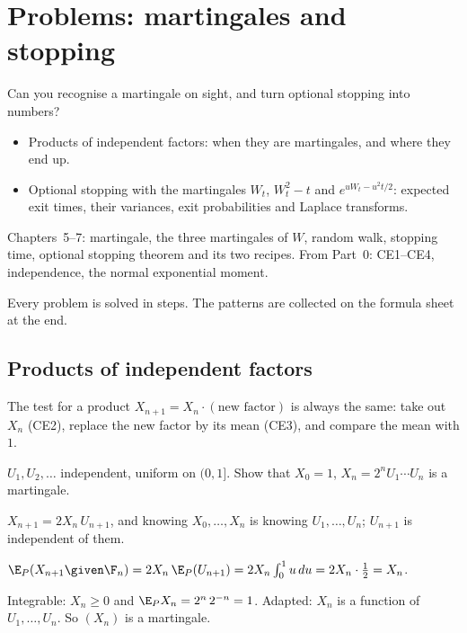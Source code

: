 \chapter{Problems: martingales and stopping}
\label{ch:prob-mg}

\begin{question}
Can you recognise a martingale on sight, and turn optional stopping into numbers?
\end{question}

\begin{whatfor}
\begin{itemize}
  \item Products of independent factors: when they are martingales, and where they end up.
  \item Optional stopping with the martingales $W_t$, $W_t^2-t$ and $e^{uW_t-u^2t/2}$: expected exit times, their variances, exit probabilities and Laplace transforms.
\end{itemize}
\end{whatfor}

\begin{prereq}
Chapters~5--7: martingale, the three martingales of $W$, random walk, stopping time, optional stopping theorem and its two recipes. From Part~0: CE1--CE4, independence, the normal exponential moment.
\end{prereq}

Every problem is solved in steps. The patterns are collected on the formula sheet at the end.

\section{Products of independent factors}

The test for a product $X_{n+1}=X_n\cdot(\text{new factor})$ is always the same: take out $X_n$ (CE2), replace the new factor by its mean (CE3), and compare the mean with $1$.

\begin{problem}
$U_1,U_2,\ldots$ independent, uniform on $(0,1]$. Show that $X_0=1$, $X_n=2^nU_1\cdots U_n$ is a martingale.
\begin{steps}
  \item $X_{n+1}=2X_n\,U_{n+1}$, and knowing $X_0,\dots,X_n$ is knowing $U_1,\dots,U_n$; $U_{n+1}$ is independent of them.
  \item $\E_P(X_{n+1}\given\F_n)=2X_n\,\E_P(U_{n+1})=2X_n\int_0^1u\,du=2X_n\cdot\tfrac12=X_n$.
  \item Integrable: $X_n\ge0$ and $\E_PX_n=2^n\,2^{-n}=1$. Adapted: $X_n$ is a function of $U_1,\dots,U_n$. So $(X_n)$ is a martingale.
\end{steps}
\end{problem}

